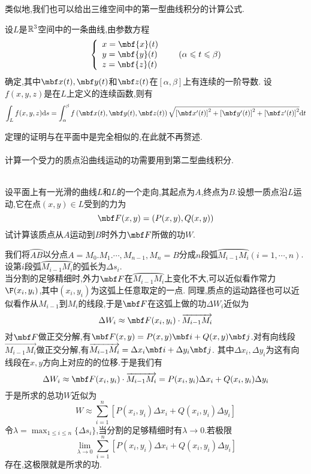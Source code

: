 \documentclass{ctexart}
\begin{document}
类似地,我们也可以给出三维空间中的第一型曲线积分的计算公式.
\begin{formal}[1.6 空间第一型曲线积分的计算]
    设$L$是$\mathbb{R}^3$空间中的一条曲线,由参数方程
    \[\left\{\begin{array}{l}
        x=\mbf{x}(t)\\y=\mbf{y}(t)\\z=\mbf{z}(t)
    \end{array}\right.\ \ \ \ \ (\alpha\leqslant t\leqslant\beta)\]
    确定,其中$\mbf x(t),\mbf y(t)$和$\mbf z(t)$在$[\alpha,\beta]$上有连续的一阶导数.%
    设$f(x,y,z)$是在$L$上定义的连续函数,则有
    \[\int_{L}f(x,y,z)\di s=\int_{\alpha}^{\beta}f\left(\mbf x(t),\mbf y(t),\mbf z(t)\right)\sqrt{\left[\mbf x'(t)\right]^2+\left[\mbf y'(t)\right]^2+\left[\mbf z'(t)\right]^2}\di t\]
\end{formal}\noindent
定理的证明与在平面中是完全相似的,在此就不再赘述.\\
\\
计算一个受力的质点沿曲线运动的功需要用到第二型曲线积分.
\begin{problem}[2.1 质点沿曲线运动所做的功]
    \\设平面上有一光滑的曲线$L$和$L$的一个走向,其起点为$A$,终点为$B$.设想一质点沿$L$运动,它在点$(x,y)\in L$受到的力为
    \[\mbf F(x,y)=\left(P(x,y),Q(x,y)\right)\]
    试计算该质点从$A$运动到$B$时外力$\mbf F$所做的功$W$.
\end{problem}
\begin{solution}
    我们将$\wideparen{AB}$以分点$A=M_0.M_1.\cdots,M_{n-1},M_n=B$分成$n$段弧$\wideparen{M_{i-1}M_{i}}(i=1,\cdots,n)$.\\
    设第$i$段弧$\wideparen{M_{i-1}M_{i}}$的弧长为$\Delta s_i$.\\
    当分割的足够精细时,外力$\mbf F$在$\wideparen{M_{i-1}M_{i}}$上变化不大,可以近似看作常力$\F(x_i,y_i)$,其中$(x_i,y_i)$为这弧上任意取定的一点.%
    同理,质点的运动路径也可以近似看作从$M_{i-1}$到$M_i$的线段,于是$\mbf F$在这弧上做的功$\Delta W_i$近似为
    \[\Delta W_i\approx \mbf F(x_i,y_i)\cdot\overrightarrow{M_{i-1}M_i}\]
    对$\mbf F$做正交分解,有$\mbf F(x,y)=P(x,y)\mbf i+Q(x,y)\mbf j$.对有向线段$\overrightarrow{M_{i-1}M_{i}}$做正交分解,有$\overrightarrow{M_{i-1}M_i}=\Delta x_i\mbf i+\Delta y_i\mbf j$.%
    其中$\Delta x_i,\Delta y_i$为这有向线段在$x,y$方向上对应的的位移.于是我们有
    \[\Delta W_i\approx \mbf F(x_i,y_i)\cdot\overrightarrow{M_{i-1}M_i}=P(x_i,y_i)\Delta x_i+Q(x_i,y_i)\Delta y_i\]
    于是所求的总功$W$近似为
    \[W\approx\sum_{i=1}^{n}\left[P(x_i,y_i)\Delta x_i+Q(x_i,y_i)\Delta y_i\right]\]
    令$\displaystyle\lambda=\max_{1\leqslant i\leqslant n}\{\Delta s_i\}$,当分割的足够精细时有$\lambda\to0$.若极限
    \[\lim_{\lambda\to0}\sum_{i=1}^{n}\left[P(x_i,y_i)\Delta x_i+Q(x_i,y_i)\Delta y_i\right]\]
    存在,这极限就是所求的功.
\end{solution}\noindent
\end{document}
